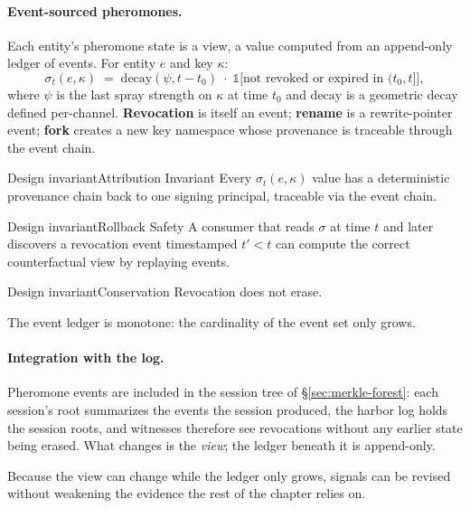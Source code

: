 \documentclass[11pt,a4paper]{article}
\theoremstyle{definition}
\theoremstyle{remark}
\begin{document}
\paragraph{Event-sourced pheromones.} Each entity's pheromone state is a view, a value computed from an append-only ledger of events. For entity $e$ and key $\kappa$:
\[
\sigma_t(e,\kappa) \;=\; \mathrm{decay}(\psi, t - t_0)\;\cdot\;\mathbb{1}\bigl[\text{not revoked or expired in }(t_0, t]\bigr],
\]
where $\psi$ is the last spray strength on $\kappa$ at time $t_0$ and $\mathrm{decay}$ is a geometric decay defined per-channel. \textbf{Revocation} is itself an event; \textbf{rename} is a rewrite-pointer event; \textbf{fork} creates a new key namespace whose provenance is traceable through the event chain.

\begin{pdclaim}{Design invariant}{Attribution Invariant}
\setlength{\parskip}{4pt plus 1pt}
\label{prop:pheromone-attribution}
Every $\sigma_t(e,\kappa)$ value has a deterministic provenance chain back to one signing principal, traceable via the event chain.
\end{pdclaim}

\begin{pdclaim}{Design invariant}{Rollback Safety}
\setlength{\parskip}{4pt plus 1pt}
\label{prop:pheromone-rollback}
A consumer that reads $\sigma$ at time $t$ and later discovers a revocation event timestamped $t' < t$ can compute the correct counterfactual view by replaying events.
\end{pdclaim}

\begin{pdclaim}{Design invariant}{Conservation}
\setlength{\parskip}{4pt plus 1pt}
\label{prop:pheromone-conservation}
Revocation does not erase.

The event ledger is monotone: the cardinality of the event set only grows.
\end{pdclaim}

\paragraph{Integration with the log.} Pheromone events are included in the session tree of \S\ref{sec:merkle-forest}: each session's root summarizes the events the session produced, the harbor log holds the session roots, and witnesses therefore see revocations without any earlier state being erased. What changes is the \emph{view}; the ledger beneath it is append-only.

Because the view can change while the ledger only grows, signals can be revised without weakening the evidence the rest of the chapter relies on.
\end{document}
